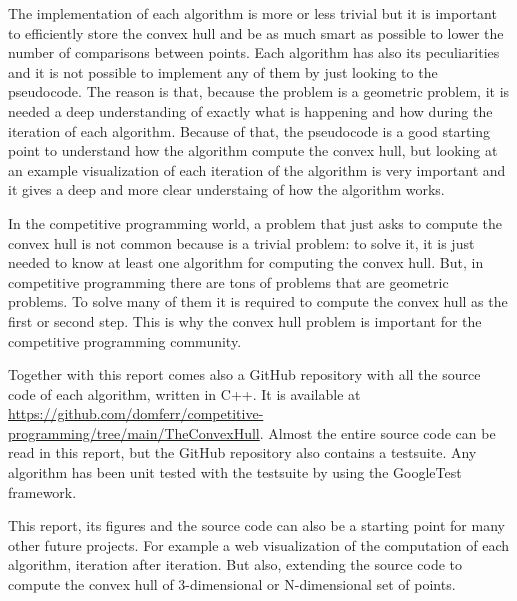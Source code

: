 \documentclass{article}
\begin{document}
The implementation of each algorithm is more or less trivial but it is important to efficiently store the convex hull and be as much smart as possible to lower the number of comparisons between points. Each algorithm has also its peculiarities and it is not possible to implement any of them by just looking to the pseudocode. The reason is that, because the problem is a geometric problem, it is needed a deep understanding of exactly what is happening and how during the iteration of each algorithm. Because of that, the pseudocode is a good starting point to understand how the algorithm compute the convex hull, but looking at an example visualization of each iteration of the algorithm is very important and it gives a deep and more clear understaing of how the algorithm works.

In the competitive programming world, a problem that just asks to compute the convex hull is not common because is a trivial problem: to solve it, it is just needed to know at least one algorithm for computing the convex hull. But, in competitive programming there are tons of problems that are geometric problems. To solve many of them it is required to compute the convex hull as the first or second step. This is why the convex hull problem is important for the competitive programming community.

Together with this report comes also a GitHub repository with all the source code of each algorithm, written in C++. It is available at \url{https://github.com/domferr/competitive-programming/tree/main/TheConvexHull}. Almost the entire source code can be read in this report, but the GitHub repository also contains a testsuite. Any algorithm has been unit tested with the testsuite by using the GoogleTest framework.

This report, its figures and the source code can also be a starting point for many other future projects. For example a web visualization of the computation of each algorithm, iteration after iteration. But also, extending the source code to compute the convex hull of 3-dimensional or N-dimensional set of points.

\newpage


\end{document}
